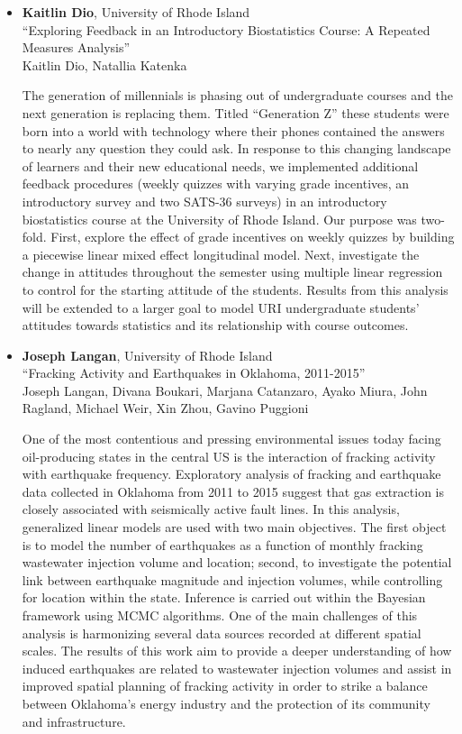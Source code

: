 \begin{itemize}
\item \textbf{Kaitlin Dio}, University of Rhode Island \\
``Exploring Feedback in an Introductory Biostatistics Course: A Repeated Measures Analysis'' \\
Kaitlin Dio, Natallia Katenka


The generation of millennials is phasing out of undergraduate courses and the next generation is replacing them. Titled “Generation Z” these students were born into a world with technology where their phones contained the answers to nearly any question they could ask. In response to this changing landscape of learners and their new educational needs, we implemented additional feedback procedures (weekly quizzes with varying grade incentives, an introductory survey and two SATS-36 surveys) in an introductory biostatistics course at the University of Rhode Island. Our purpose was two-fold. First, explore the effect of grade incentives on weekly quizzes by building a piecewise linear mixed effect longitudinal model. Next, investigate the change in attitudes throughout the semester using multiple linear regression to control for the starting attitude of the students. Results from this analysis will be extended to a larger goal to model URI undergraduate students’ attitudes towards statistics and its relationship with course outcomes. 

\item \textbf{Joseph Langan}, University of Rhode Island \\
``Fracking Activity and Earthquakes in Oklahoma, 2011-2015'' \\
Joseph Langan, Divana Boukari, Marjana Catanzaro, Ayako Miura, John Ragland, Michael Weir, Xin Zhou, Gavino Puggioni


One of the most contentious and pressing environmental issues today facing oil-producing states in the central US is the interaction of fracking activity with earthquake frequency. Exploratory analysis of fracking and earthquake data collected in Oklahoma from 2011 to 2015 suggest that gas extraction is closely associated with seismically active fault lines. In this analysis, generalized linear models are used with two main objectives. The first object is to model the number of earthquakes as a function of monthly fracking wastewater injection volume and location; second, to investigate the potential link between earthquake magnitude and injection volumes, while controlling for location within the state. Inference is carried out within the Bayesian framework using MCMC algorithms. One of the main challenges of this analysis is harmonizing several data sources recorded at different spatial scales. The results of this work aim to provide a deeper understanding of how induced earthquakes are related to wastewater injection volumes and assist in improved spatial planning of fracking activity in order to strike a balance between Oklahoma's energy industry and the protection of its community and infrastructure.


\end{itemize}
